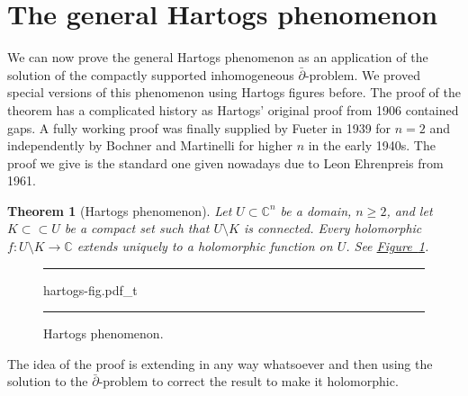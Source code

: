 \documentclass[12pt,openany]{book}
\newcommand{\C}{{\mathbb{C}}}
\theoremstyle{plain}
\newtheorem{thm}{Theorem}[section]
\theoremstyle{remark}
\theoremstyle{definition}
\newenvironment{myfig}{%
\begin{figure}[h!t]
\noindent\rule{\textwidth}{0.5pt}\vspace{12pt}\par\centering}%
{\par\noindent\rule{\textwidth}{0.5pt}
\end{figure}}
\theoremstyle{exercise}
\theoremstyle{example}
\newcommand{\figureref}[1]{\hyperref[#1]{Figure~\ref*{#1}}}
\begin{document}

\section{The general Hartogs phenomenon}
\label{sec:hartogsphenom}

We can now prove the general Hartogs phenomenon as an application of the
solution of the compactly supported
inhomogeneous $\bar{\partial}$-problem.  We proved special
versions of this phenomenon using Hartogs figures before.
The proof of the theorem has a complicated history as
Hartogs' original proof from 1906 contained gaps.
A fully working proof was finally supplied by Fueter in 1939 for $n=2$
and independently by Bochner and Martinelli for higher $n$
in the early 1940s.
The proof we give is the
standard one given nowadays due to Leon Ehrenpreis from 1961.

\begin{thm}[Hartogs phenomenon]
Let $U \subset \C^n$ be a domain, $n \geq 2$, and let
$K \subset \subset U$ be a compact set such that
$U \setminus K$ is connected.  Every holomorphic $f \colon U \setminus K \to \C$
extends uniquely to a holomorphic function on $U$.
See \figureref{fig:hartogs-fig}.
\end{thm}

\begin{myfig}
{hartogs-fig.pdf_t}
\caption{Hartogs phenomenon.\label{fig:hartogs-fig}}
\end{myfig}

The idea of the proof is extending in any way whatsoever and then using the solution
to the $\bar{\partial}$-problem to correct the result to make it
holomorphic.
\end{document}

